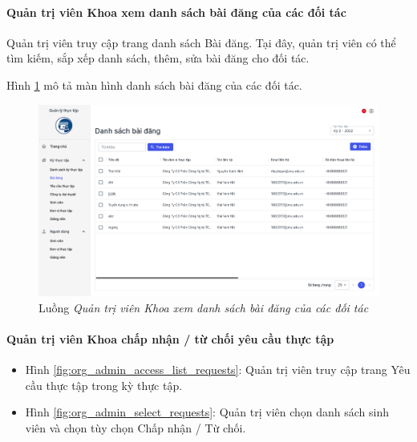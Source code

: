 \documentclass[./../main.tex]{subfiles}
\begin{document}
\paragraph*{Quản trị viên Khoa xem danh sách bài đăng của các đối tác}

Quản trị viên truy cập trang danh sách Bài đăng. Tại đây, quản trị viên có thể tìm kiếm, sắp xếp danh sách, thêm, sửa bài đăng cho đối tác.

Hình \ref{fig:orgadmin_list_posts} mô tả màn hình danh sách bài đăng của các đối tác.

\begin{figure}[]
	\includegraphics[width=\linewidth]{./images/image71.png}
	\caption{Luồng \emph{Quản trị viên Khoa xem danh sách bài đăng của các đối tác}}
	\label{fig:orgadmin_list_posts}
\end{figure}

\paragraph*{Quản trị viên Khoa chấp nhận / từ chối yêu cầu thực tập}

\begin{itemize}
	\item Hình \ref{fig:org_admin_access_list_requests}: Quản trị viên truy cập trang Yêu cầu thực tập trong kỳ thực tập.
	\item Hình \ref{fig:org_admin_select_requests}: Quản trị viên chọn danh sách sinh viên và chọn tùy chọn Chấp nhận / Từ chối.
\end{itemize}
\end{document}
